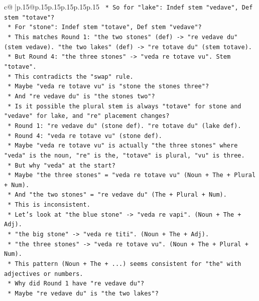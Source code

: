 \documentclass{article}
\begin{document}
{\begin{supertabular}{c@{$\;$}|p{.15\linewidth}@{}p{.15\linewidth}p{.15\linewidth}p{.15\linewidth}p{.15\linewidth}p{.15\linewidth}}
{{{\texttt{        *   So for "lake": Indef stem "vedave", Def stem "totave"?} \\
\texttt{        *   For "stone": Indef stem "totave", Def stem "vedave"?} \\
\texttt{        *   This matches Round 1: "the two stones" (def) {-}> "re vedave du" (stem vedave). "the two lakes" (def) {-}> "re totave du" (stem totave).} \\
\texttt{        *   But Round 4: "the three stones" {-}> "veda re totave vu". Stem "totave".} \\
\texttt{        *   This contradicts the "swap" rule.} \\
\texttt{        *   Maybe "veda re totave vu" is "stone the stones three"?} \\
\texttt{        *   And "re vedave du" is "the stones two"?} \\
\texttt{        *   Is it possible the plural stem is always "totave" for stone and "vedave" for lake, and "re" placement changes?} \\
\texttt{        *   Round 1: "re vedave du" (stone def). "re totave du" (lake def).} \\
\texttt{        *   Round 4: "veda re totave vu" (stone def).} \\
\texttt{        *   Maybe "veda re totave vu" is actually "the three stones" where "veda" is the noun, "re" is the, "totave" is plural, "vu" is three.} \\
\texttt{        *   But why "veda" at the start?} \\
\texttt{        *   Maybe "the three stones" = "veda re totave vu" (Noun + The + Plural + Num).} \\
\texttt{        *   And "the two stones" = "re vedave du" (The + Plural + Num).} \\
\texttt{        *   This is inconsistent.} \\
\texttt{        *   Let's look at "the blue stone" {-}> "veda re vapi". (Noun + The + Adj).} \\
\texttt{        *   "the big stone" {-}> "veda re titi". (Noun + The + Adj).} \\
\texttt{        *   "the three stones" {-}> "veda re totave vu". (Noun + The + Plural + Num).} \\
\texttt{        *   This pattern (Noun + The + ...) seems consistent for "the" with adjectives or numbers.} \\
\texttt{        *   Why did Round 1 have "re vedave du"?} \\
\texttt{        *   Maybe "re vedave du" is "the two lakes"?} \\
}}}
\end{supertabular}}
\end{document}
